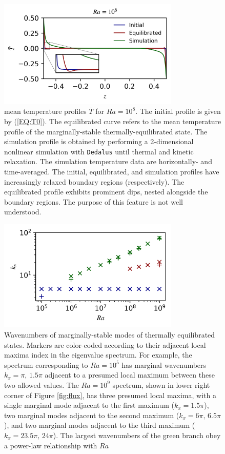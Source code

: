 \documentclass[reprint,amsmath,amssymb,aps]{revtex4-1}
\begin{document}
\begin{figure}[h]
    \centering
    \includegraphics[width=3.4in]{T_profs_na.png}
    \caption{mean temperature profiles $\bar{T}$ for $Ra = 10^8$. The initial profile is given by (\ref{EQ:T0}). The equilibrated curve refers to the mean temperature profile of the marginally-stable thermally-equilibrated state. The simulation profile is obtained by performing a 2-dimensional nonlinear simulation with \texttt{Dedalus} until thermal and kinetic relaxation. The simulation temperature data are horizontally- and time-averaged. The initial, equilibrated, and simulation profiles have increasingly relaxed boundary regions (respectively). The equilibrated profile exhibits prominent dips, nested alongside the boundary regions. The purpose of this feature is not well understood.}
    \label{fig:T0_profiles}
\end{figure}
\begin{figure}[h]
    \centering
    \includegraphics[width=3.4in]{kx_m_ra1.png}
    \caption{Wavenumbers of marginally-stable modes of thermally equilibrated states. Markers are color-coded according to their adjacent local maxima index in the eigenvalue spectrum. For example, the spectrum corresponding to $Ra = 10^5$ has marginal wavenumbers $k_x = \pi, \, 1.5\pi$ adjacent to a presumed local maximum between these two allowed values. The $Ra = 10^9$ spectrum, shown in lower right corner of Figure \ref{fig:flux}, has three presumed local maxima, with a single marginal mode adjacent to the first maximum ($k_x = 1.5\pi$), two marginal modes adjacent to the second maximum ($k_x = 6\pi, \, 6.5\pi$), and two marginal modes adjacent to the third maximum ($k_x = 23.5\pi, \, 24\pi$). The largest wavenumbers of the green branch obey a power-law relationship with $Ra$}
    \label{fig:kx_marginals}
\end{figure}
\end{document}
